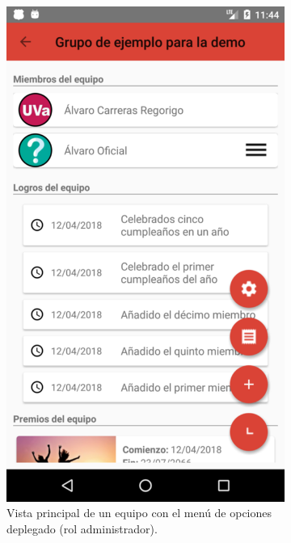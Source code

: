 \documentclass[twoside]{report}
\begin{document}
\begin{figure}[H]
\begin{center}
\begin{subfigure}[t]{.3\linewidth}
		\includegraphics[scale=0.2]{images/userguide/15.png}
		\caption{Vista principal de un equipo con  el menú de opciones deplegado (rol administrador).}
	\end{subfigure}\hspace{2mm}%
	\begin{subfigure}[t]{.3\linewidth}

\end{subfigure}
\end{center}
\end{figure}
\end{document}
